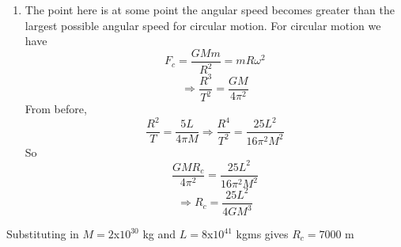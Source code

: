 \begin{hint}
{\begin{enumerate}
Substituting all these values in gives $L = 8$x$10^{41}$ kgms

\item The point here is at some point the angular speed becomes greater than the largest possible angular speed for circular motion. For circular motion we have 
\begin{equation*} F_c=\frac{GMm}{R^2}=mR\omega^2
\end{equation*}
\begin{equation*} \Rightarrow \frac{R^3}{T^2}=\frac{GM}{4\pi^2}
\end{equation*}
From before, 
\begin{equation*} \frac{R^2}{T}=\frac{5L}{4\pi M} \Rightarrow \frac{R^4}{T^2}=\frac{25L^2}{16\pi^2M^2}
\end{equation*}
So
\begin{equation*} \frac{GMR_c}{4\pi^2}=\frac{25L^2}{16\pi^2M^2}
\end{equation*}
\begin{equation*} \Rightarrow R_c=\frac{25L^2}{4GM^3}
\end{equation*}
\end{enumerate}

Substituting in  $M = 2 $x$10^{30}$ kg and  $L = 8$x$10^{41}$ kgms gives $ R_c = 7000$  m
}
\end{hint}